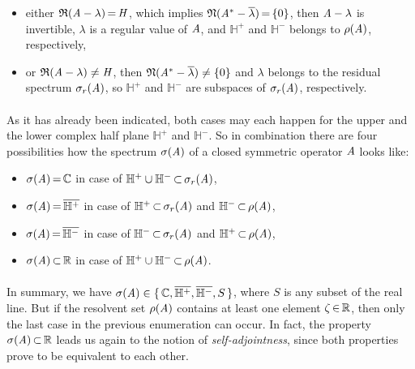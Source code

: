 \documentclass[11pt,twoside]{article}
\begin{document}
\begin{itemize}
\item[a)]
either $\mathfrak{R}(\mathit{A} - \lambda) {\,=\,} \mathit{H}$,
which implies $\mathfrak{N}(\mathit{A}^* - \overline{\lambda}) {\,=\,} \{0\}$,
then $\mathit{A} - \lambda$ is invertible,
$\lambda$ is a regular value of $\mathit{A}$,
and $\mathbb{H}^+$ and $\mathbb{H}^-$ belongs to $\rho(\mathit{A})$,
respectively,

\item[b)]
or $\mathfrak{R}(\mathit{A} - \lambda) \neq \mathit{H}$,
then $\mathfrak{N}(\mathit{A}^* - \overline{\lambda}) \neq \{0\}$
and $\lambda$ belongs to the residual spectrum $\sigma_r(\mathit{A})$,
so $\mathbb{H}^+$ and $\mathbb{H}^-$ are subspaces of $\sigma_r(\mathit{A})$,
respectively.
\end{itemize}

\paragraph*{}
As it has already been indicated,
both cases may each happen for the upper and the lower complex half plane 
$\mathbb{H}^+$ and $\mathbb{H}^-$.
So in combination there are four possibilities
how the spectrum $\sigma(\mathit{A})$ of a closed symmetric operator $\mathit{A}$
looks like:

\begin{itemize}[leftmargin=12pt,itemsep=2pt]
\item[1.]
$\sigma(\mathit{A}) {\,=\,} {\mathbb{C}}$
in case of $\mathbb{H}^+ \cup \mathbb{H}^- {\,\subset\,} \sigma_r(\mathit{A})$,
\item[2.]
$\sigma(\mathit{A}) {\,=\,} \overline{\mathbb{H}^+}$
in case of $\mathbb{H}^+ {\,\subset\,} \sigma_r(\mathit{A})$ and
$\mathbb{H}^- {\,\subset\,} \rho(\mathit{A})$,
\item[3.]
$\sigma(\mathit{A}) {\,=\,} \overline{\mathbb{H}^-}$
in case of $\mathbb{H}^- {\,\subset\,} \sigma_r(\mathit{A})$ and
$\mathbb{H}^+ {\,\subset\,} \rho(\mathit{A})$,
\item[4.]
$\sigma(\mathit{A}) {\,\subset\,} {\mathbb{R}}$
in case of $\mathbb{H}^+ \cup \mathbb{H}^- {\,\subset\,} \rho(\mathit{A})$.
\end{itemize}

\paragraph*{}
In summary,
we have
$\sigma(\mathit{A}) \in
\{\,{\mathbb{C}},\overline{\mathbb{H}^+},\overline{\mathbb{H}^-},S\,\}$,
where $S$ is any subset of the real line.
But if the resolvent set $\rho(\mathit{A})$
contains at least one element $\zeta {\,\in\,} {\mathbb{R}}$,
then only the last case in the previous enumeration can occur.
In fact,
the property $\sigma(\mathit{A}) {\,\subset\,} {\mathbb{R}}$ leads us again
to the notion of \textit{self-adjointness},
since both properties prove to be equivalent to each other.
\end{document}
